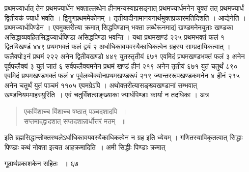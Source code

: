 \documentclass[11pt, openany]{book}
\begin{document}
\begin{sloppypar}
प्रथमज्यार्धात् तेन प्रथमज्यार्धेन भक्ताल्लब्धेन हीनमन्यस्याप्रसङ्गात् प्रथमज्यार्धमनेन युक्तं तत् प्रथमज्यार्धं द्वितीयकं ज्यार्धं भवति । द्विगुणप्रथममेकोनम् । तृतीयादीनामानयनार्थमुक्तप्रकारमतिदिशति । आद्येनेति । प्रथमज्यार्धपिण्डेन । एवमुक्तरीत्या क्रमात् सिद्धपिण्डान् भक्ता लब्धैरूनमाद्यं खण्डमनेनयुताः खण्डका असिद्धाव्यवहितसिद्धज्यार्धपिण्डा असिद्धपिण्डा भवन्ति । यथा प्रथमखण्डं २२५ प्रथमभक्तं फलं १ द्वितयिखण्डं ४४९ प्रथमभक्तं फलं द्वयं २ अर्धाधिकावयवस्यैकाधिकत्वेन ग्रहस्य साम्प्रदायिकत्वात् । फलैक्यो३नं प्रथमं २२२ अनेन द्वितीयखण्डो ४४९ युतस्तृतीयं ६७१ एवमिदं प्रथमखण्डभक्तं फलं ३ अनेन पूर्वफलैक्यं ३ युतं जातं ६ सर्वफलैक्यमनेन प्रथमं खण्डं हीनं २१९ अनेन तृतीयं ६७१ युतं चतुर्थं ८९० एवमिदं प्रथमखण्डभक्तं फलं ४ पूर्वलब्धैक्योनप्रथमखण्डरूपं २१९ ज्यान्तररूपखण्डकमनेन ४ हीनं २१५ अनेन चतुर्थं युतं पञ्चमं ११०५ एवमग्रेऽपि । अथोक्तरीत्यासङ्ख्यखण्डानां सम्भवात् खण्डनियममाह\textendash स्युरिति~। एवं चतुर्विंशत्सङ्ख्याका ज्यार्धपिण्डाः कार्या न तदधिका । अत्र\textendash
\end{sloppypar}
\begin{quote}

{\qt एकविंशाच्च विंशाच्च षष्ठात् पञ्चदशादपि ~।\\
सप्तमाद्द्वादशात् सप्तदशान्नार्धोत्तरं मतम् ~॥}
\end{quote}
\begin{sloppypar}

इति ब्रह्मसिद्धान्तोक्तस्थलेऽर्धाधिकावयवस्यैकाधिकत्वेन न ग्रह इति ध्येयम् । गणितस्याविकृतत्वात् सिद्धाः पिण्डाः कथं नोक्ता इत्यत आह\textendash क्रमादिति~। अमी सिद्धीः पिण्डाः क्रमात्\textendash
\end{sloppypar}

\newpage


\hspace{3cm} गूढार्थप्रकाशकेन सहितः ~। \hfill ६७
\vspace{1cm}
\end{document}
